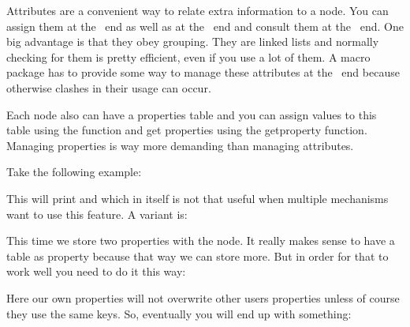 \startsubsection[title={Properties}]

Attributes are a convenient way to relate extra information to a node. You can
assign them at the \TEX\ end as well as at the \LUA\ end and consult them at the
\LUA\ end. One big advantage is that they obey grouping. They are linked lists
and normally checking for them is pretty efficient, even if you use a lot of
them. A macro package has to provide some way to manage these attributes at the
\TEX\ end because otherwise clashes in their usage can occur.

Each node also can have a properties table and you can assign values to this
table using the  function and get properties using the \type
{getproperty} function. Managing properties is way more demanding than managing
attributes.

Take the following example:

\starttyping
{}
\stoptyping

This will print  and  which in itself is not that useful
when multiple mechanisms want to use this feature. A variant is:

\starttyping
{}
\stoptyping

This time we store two properties with the node. It really makes sense to have a
table as property because that way we can store more. But in order for that to
work well you need to do it this way:

\starttyping
{}
\stoptyping

Here our own properties will not overwrite other users properties unless of
course they use the same keys. So, eventually you will end up with something:

